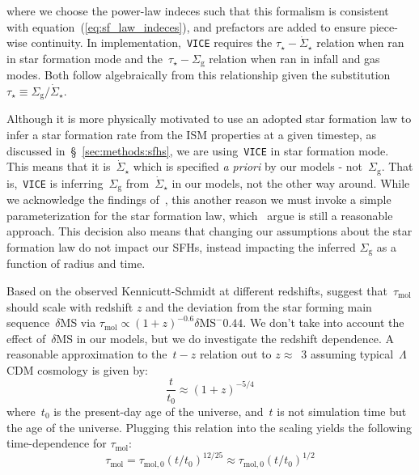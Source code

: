 \documentclass[fleqn, usenatbib]{mnras}
\newcommand{\refp}[1]{(\ref{#1})}
\begin{document}
where we choose the power-law indeces such that this formalism is consistent 
with equation~\refp{eq:sf_law_indeces}, and prefactors are added to ensure 
piece-wise continuity. In implementation,~\texttt{VICE} requires the 
$\tau_\star-\dot{\Sigma}_\star$ relation when ran in star formation mode and 
the~$\tau_\star-\Sigma_\text{g}$ relation when ran in infall and gas modes. 
Both follow algebraically from this relationship given the substitution 
$\tau_\star \equiv \Sigma_\text{g} / \dot{\Sigma}_\star$. 
\par 
Although it is more physically motivated to use an adopted star formation law 
to infer a star formation rate from the ISM properties at a given timestep, as 
discussed in~\S~\ref{sec:methods:sfhs}, we are using~\texttt{VICE} in star 
formation mode. This means that it is~$\dot{\Sigma}_\star$ which is specified 
\textit{a priori} by our models - not~$\Sigma_\text{g}$. That is,~\texttt{VICE} 
is inferring~$\Sigma_\text{g}$ from~$\dot{\Sigma}_\star$ in our models, not 
the other way around. While we acknowledge the findings of~\citet{Ellison2020b}, 
this another reason we must invoke a simple parameterization for the star 
formation law, which~\citet{Kennicutt2020} argue is still a reasonable 
approach. This decision also means that changing our assumptions about the 
star formation law do not impact our SFHs, instead impacting the inferred 
$\Sigma_\text{g}$ as a function of radius and time. 
\par 
Based on the observed Kennicutt-Schmidt at different redshifts, 
\citet{Tacconi2018} suggest that~$\tau_\text{mol}$ should scale with redshift 
$z$ and the deviation from the star forming main sequence~$\delta$MS via 
$\tau_\text{mol} \propto (1 + z)^{-0.6}\delta\text{MS}^-0.44$. We don't take 
into account the effect of~$\delta$MS in our models, but we do investigate the 
redshift dependence. A reasonable approximation to the~$t - z$ relation out to 
$z \approx$~3 assuming typical~$\Lambda$CDM cosmology is given by: 
\begin{equation} 
\frac{t}{t_0} \approx (1 + z)^{-5/4} 
\end{equation} 
where~$t_0$ is the present-day age of the universe, and~$t$ is not simulation 
time but the age of the universe. Plugging this relation into the 
\citet{Tacconi2018} scaling yields the following time-dependence for 
$\tau_\text{mol}$: 
\begin{equation} 
\tau_\text{mol} = \tau_{\text{mol},0}(t/t_0)^{12/25} \approx 
\tau_{\text{mol},0}(t/t_0)^{1/2} 
\end{equation} 
\end{document}
